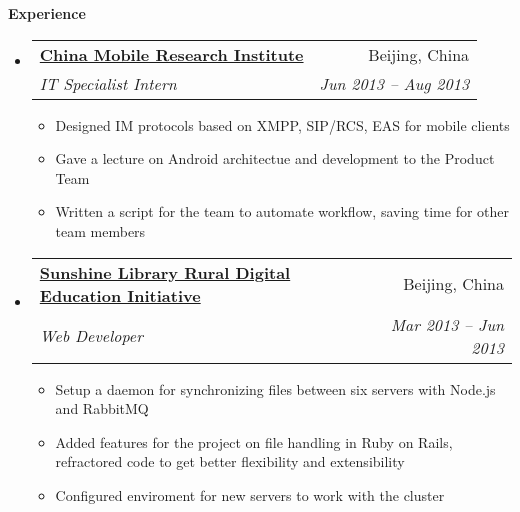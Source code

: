 \documentclass[letterpaper,11pt]{article}
\makeatletter
\newcommand{\resitem}[1]{\item #1 \vspace{-2pt}}
\newcommand{\resheading}[1]{{\large \colorbox{mygrey}{\begin{minipage}{\textwidth}{\textbf{#1 \vphantom{p\^{E}}}}\end{minipage}}}}
\newcommand{\ressubheading}[4]{
\begin{tabular*}{6.5in}{l@{\extracolsep{\fill}}r}
        \textbf{#1} & #2 \\
        \textit{#3} & \textit{#4} \\
\end{tabular*}\vspace{-6pt}}
\makeatother
\begin{document}
\resheading{Experience}
    \begin{itemize}
        \item 
            \ressubheading{\href{http://labs.chinamobile.com/}{China Mobile Research Institute}}{Beijing, China}
                {IT Specialist Intern}{Jun 2013 -- Aug 2013}
                { \footnotesize
                \begin{itemize}

                        \resitem{Designed IM protocols based on XMPP, SIP/RCS, EAS for mobile clients}
                        \resitem{Gave a lecture on Android architectue and development to the Product Team}
                        \resitem{Written a script for the team to automate workflow, saving time for other team members}
                \end{itemize}
                }
        \item 
            \ressubheading{\href{http://www.sunshine-library.org}{Sunshine Library Rural Digital Education Initiative}}{Beijing, China}{Web Developer}{Mar 2013 -- Jun 2013}
                { \footnotesize
                \begin{itemize}
                        \resitem{Setup a daemon for synchronizing files between six servers with Node.js and RabbitMQ}
                        \resitem{Added features for the project on file handling in Ruby on Rails, refractored code to get better flexibility and extensibility}
                        \resitem{Configured enviroment for new servers to work with the cluster}
                \end{itemize}
                }
    \end{itemize}  %
\end{document}
